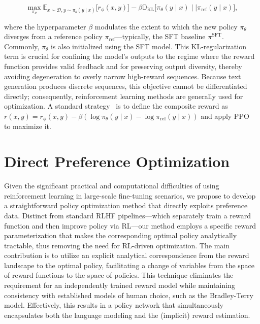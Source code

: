 \begin{equation}\label{eq:RL}
\max_{\pi_{\theta}}  \mathbb{E}_{x\sim \mathcal{D}, y\sim \pi_{\theta}(y \mid x)}\bigl[r_{\phi}(x, y)\bigr] - \beta\mathbb{D}_{\textrm{KL}}\bigl[\pi_{\theta}(y\mid x)\mid \mid \pi_\text{ref}(y\mid x)\bigr],
\end{equation}

where the hyperparameter $\beta$ modulates the extent to which the new policy $\pi_\theta$ diverges from a reference policy $\pi_\text{ref}$—typically, the SFT baseline $\pi^\text{SFT}$. Commonly, $\pi_\theta$ is also initialized using the SFT model. This KL-regularization term is crucial for confining the model’s outputs to the regime where the reward function provides valid feedback and for preserving output diversity, thereby avoiding degeneration to overly narrow high-reward sequences. Because text generation produces discrete sequences, this objective cannot be differentiated directly; consequently, reinforcement learning methods are generally used for optimization. A standard strategy~\cite{ziegler2020finetuning, stiennon2022learning, bai2022training, ouyang2022training} is to define the composite reward as $r(x, y) = r_{\phi}(x, y) -\beta (\log \pi_{\theta}(y\mid x) - \log \pi_\text{ref}(y\mid x))$ and apply PPO~\cite{schulman2017proximal} to maximize it.

\section{Direct Preference Optimization}\label{sec:DPO}

Given the significant practical and computational difficulties of using reinforcement learning in large-scale fine-tuning scenarios, we propose to develop a straightforward policy optimization method that directly exploits preference data. Distinct from standard RLHF pipelines—which separately train a reward function and then improve policy via RL—our method employs a specific reward parameterization that makes the corresponding optimal policy analytically tractable, thus removing the need for RL-driven optimization. The main contribution is to utilize an explicit analytical correspondence from the reward landscape to the optimal policy, facilitating a change of variables from the space of reward functions to the space of policies. This technique eliminates the requirement for an independently trained reward model while maintaining consistency with established models of human choice, such as the Bradley-Terry model. Effectively, this results in a policy network that simultaneously encapsulates both the language modeling and the (implicit) reward estimation.

